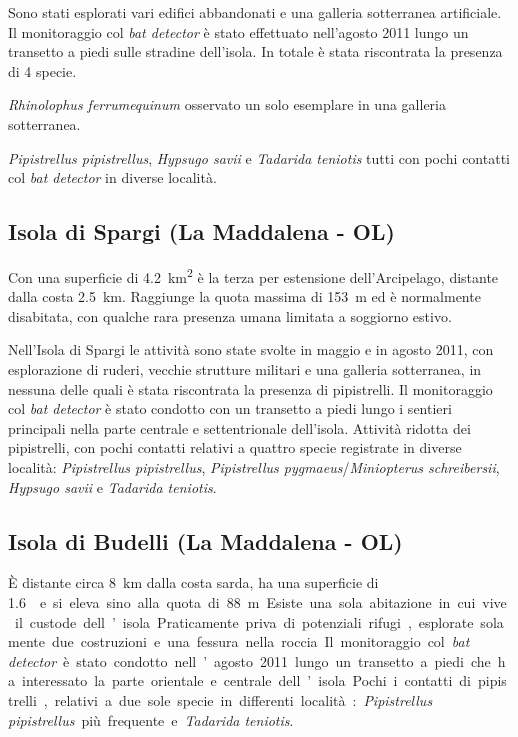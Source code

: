 \begin{multicols}{2}
\begin{compactdesc}
Sono stati esplorati vari edifici abbandonati e una galleria sotterranea artificiale. Il monitoraggio col \textit{bat detector} è stato effettuato nell’agosto 2011 lungo un transetto a piedi sulle stradine dell’isola. 
In totale è stata riscontrata la presenza di 4 specie. 
\begin{compactdesc}
\item[\emph{Rhinolophus ferrumequinum}] osservato un solo esemplare in una galleria sotterranea.
\item[\emph{Pipistrellus pipistrellus}, \emph{Hypsugo savii} e \emph{Tadarida teniotis}] tutti con pochi contatti col \textit{bat detector} in diverse località.
\end{compactdesc}

\subsection*{Isola di Spargi (La Maddalena - OL)}
Con una superficie di \SI{4.2}{\square\kilo\meter} è la terza per estensione dell'Arcipelago, distante dalla costa 2.5~km. Raggiunge la quota massima di 153~m ed è normalmente disabitata, con qualche rara presenza umana limitata a soggiorno estivo.

Nell’Isola di Spargi le attività sono state svolte in maggio e in agosto 2011, con esplorazione di ruderi, vecchie strutture militari e una galleria sotterranea, in nessuna delle quali è stata riscontrata la presenza di pipistrelli.
Il monitoraggio col \textit{bat detector} è stato condotto con un transetto a piedi lungo i sentieri principali nella parte centrale e settentrionale dell’isola. Attività ridotta dei pipistrelli, con pochi contatti relativi a quattro specie registrate in diverse località: \emph{Pipistrellus pipistrellus}, \emph{Pipistrellus pygmaeus}/\emph{Miniopterus schreibersii}, \emph{Hypsugo savii} e \emph{Tadarida teniotis}.

\subsection*{Isola di Budelli (La Maddalena - OL)}
È distante circa 8~km dalla costa sarda, ha una superficie di \SI{1.6}{\square\kilo\meters} e si eleva sino alla quota di 88~m. Esiste una sola abitazione in cui vive il custode dell’isola.

Praticamente priva di potenziali rifugi, esplorate solamente due costruzioni e una fessura nella roccia.
Il monitoraggio col \textit{bat detector} è stato condotto nell’agosto 2011 lungo un transetto a piedi che ha interessato la parte orientale e centrale dell’isola. Pochi i contatti di pipistrelli, relativi a due sole specie in differenti località: \emph{Pipistrellus pipistrellus} più frequente e \emph{Tadarida teniotis}.


\end{compactdesc}
\end{multicols}
